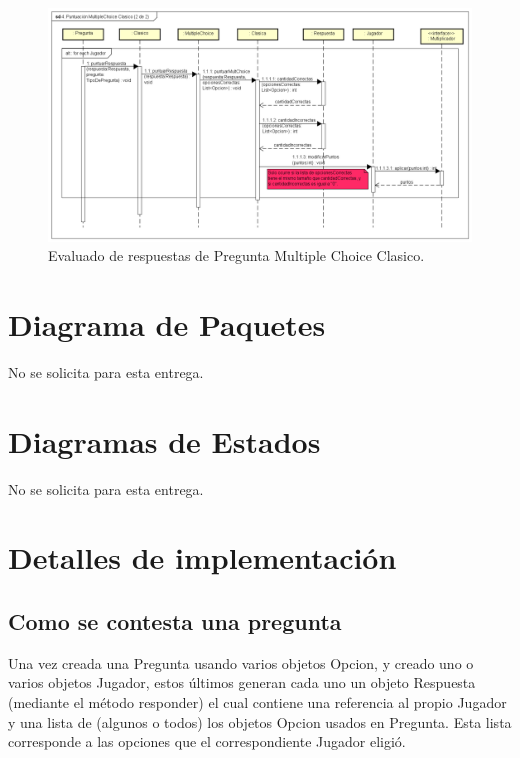 \documentclass[titlepage,a4paper]{article}
\begin{document}
\begin{figure}[H]
\centering
\includegraphics[width=1\textwidth]{img/UMLSeq5.png}
\caption{\label{fig:class01}Evaluado de respuestas de Pregunta Multiple Choice Clasico.}
\end{figure}

\section{Diagrama de Paquetes}

No se solicita para esta entrega.

\section{Diagramas de Estados}

No se solicita para esta entrega.

\section{Detalles de implementación}

\subsection{Como se contesta una pregunta}

Una vez creada una Pregunta usando varios objetos Opcion, y creado uno o varios objetos Jugador, estos últimos generan cada uno un objeto Respuesta (mediante el método responder) el cual contiene una referencia al propio Jugador y una lista de (algunos o todos) los objetos Opcion usados en Pregunta. Esta lista corresponde a las opciones que el correspondiente Jugador eligió.
\end{document}
